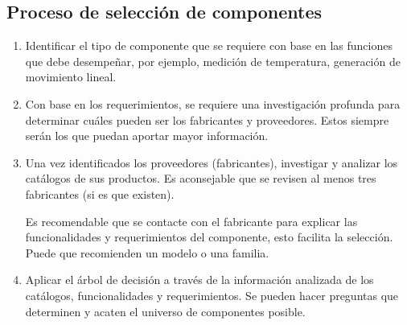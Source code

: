 \subsection{Proceso de selección de componentes}
\begin{enumerate}
    \item Identificar el tipo de componente que se requiere con base en las funciones que debe desempeñar, por ejemplo, medición de temperatura, generación de movimiento lineal. 
    
    \item Con base en los requerimientos, se requiere una investigación profunda para determinar cuáles pueden ser los fabricantes y proveedores. Estos siempre serán los que puedan aportar mayor información.
    
    \item Una vez identificados los proveedores (fabricantes), investigar y analizar los catálogos de sus productos. Es aconsejable que se revisen al menos tres fabricantes (si es que existen). 
    
    Es recomendable que se contacte con el fabricante para explicar las funcionalidades y requerimientos del componente, esto facilita la selección. Puede que recomienden un modelo o una familia.
    
    \item Aplicar el árbol de decisión a través de la información analizada de los catálogos, funcionalidades y requerimientos. Se pueden hacer preguntas que determinen y acaten el universo de componentes posible. 
\end{enumerate}